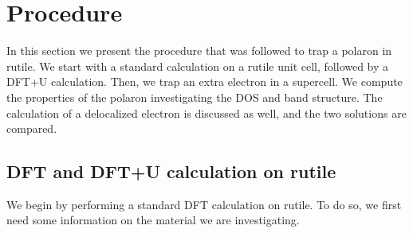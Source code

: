 \section{Procedure}
In this section we present the procedure that was followed to trap a polaron in rutile. We start with a standard calculation on a rutile unit cell, followed by a DFT+U calculation. Then, we trap an extra electron in a supercell. We compute the properties of the polaron investigating the DOS and band structure. The calculation of a delocalized electron is discussed as well, and the two solutions are compared.
\subsection{DFT and DFT+U calculation on rutile}
We begin by performing a standard DFT calculation on rutile. To do so, we first need some information on the material we are investigating.

